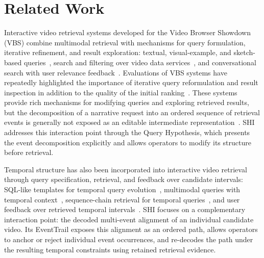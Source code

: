\section{Related Work}
\label{sec:related-work}

Interactive video retrieval systems developed for the Video Browser Showdown
(VBS) combine multimodal retrieval with mechanisms for query formulation,
iterative refinement, and result exploration: textual, visual-example, and
sketch-based queries~\cite{amato2024visione}, search and filtering over video
data services~\cite{lokoc2024prak}, and conversational search with user
relevance feedback~\cite{sharma2025exquisitor}. Evaluations of VBS systems have
repeatedly highlighted the importance of iterative query reformulation and
result inspection in addition to the quality of the initial
ranking~\cite{lokoc2023queryreformulation,schall2024interactive,jackl2026interaction}. 
These systems provide rich mechanisms for modifying
queries and exploring retrieved results, but the decomposition of a narrative
request into an ordered sequence of retrieval events is generally not exposed
as an editable intermediate representation~\cite{amato2024visione,lokoc2024prak,sharma2025exquisitor}. SHI addresses this interaction
point through the Query Hypothesis, which presents the event
decomposition explicitly and allows operators to modify its structure before
retrieval.

Temporal structure has also been incorporated into interactive video retrieval
through query specification, retrieval, and feedback over candidate intervals:
SQL-like templates for temporal query evolution~\cite{wu2021sql}, multimodal
queries with temporal context~\cite{heller2022temporalqueries}, sequence-chain
retrieval for temporal queries~\cite{khan2026temporalqueries}, and user
feedback over retrieved temporal intervals~\cite{ma2022ivcmr}.
SHI focuses on a complementary interaction point: the decoded multi-event
alignment of an individual candidate video. Its EventTrail exposes this
alignment as an ordered path, allows operators to anchor or reject individual
event occurrences, and re-decodes the path under the resulting temporal
constraints using retained retrieval evidence.